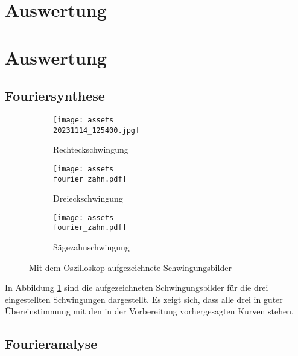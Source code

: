 \section{Auswertung}
\label{sec:Auswertung}

\section{Auswertung}
\subsection{Fouriersynthese}
\begin{figure}
\begin{subfigure}{0.5\textwidth}
    \centering
    \texttt{[image: assets\\20231114\_125400.jpg]}
    \caption{Rechteckschwingung}
\end{subfigure}
\begin{subfigure}{0.5\textwidth}
    \centering
    \texttt{[image: assets\\fourier\_zahn.pdf]}
    \caption{Dreieckschwingung}
\end{subfigure}
\begin{subfigure}{0.5\textwidth}
    \centering
    \texttt{[image: assets\\fourier\_zahn.pdf]}
    \caption{Sägezahnschwingung}
\end{subfigure}
\caption{Mit dem Oszilloskop aufgezeichnete Schwingungsbilder}
\label{fig:oszi}
\end{figure}

In Abbildung \ref{fig:oszi} sind die aufgezeichneten Schwingungsbilder für die drei eingestellten Schwingungen dargestellt. Es zeigt sich, dass alle drei in guter Übereinstimmung mit den in der Vorbereitung vorhergesagten Kurven stehen.

\subsection{Fourieranalyse}
